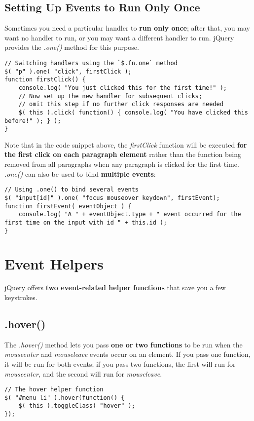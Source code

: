 \documentclass[10pt,letterpaper]{report}
\begin{document}
\subsection{Setting Up Events to Run Only Once}
Sometimes you need a particular handler to \textbf{run only once}; after that, you may want no handler to run, or you may want a different handler to run. jQuery provides the \textit{.one()} method for this purpose.
\begin{lstlisting}
// Switching handlers using the `$.fn.one` method
$( "p" ).one( "click", firstClick );
function firstClick() {
	console.log( "You just clicked this for the first time!" );
	// Now set up the new handler for subsequent clicks;
	// omit this step if no further click responses are needed
	$( this ).click( function() { console.log( "You have clicked this before!" ); } );
}
\end{lstlisting}
Note that in the code snippet above, the \textit{firstClick} function will be executed \textbf{for the first click on each paragraph element} rather than the function being removed from all paragraphs when any paragraph is clicked for the first time.\\
\textit{.one()} can also be used to bind \textbf{multiple events}:
\begin{lstlisting}
// Using .one() to bind several events
$( "input[id]" ).one( "focus mouseover keydown", firstEvent);
function firstEvent( eventObject ) {
	console.log( "A " + eventObject.type + " event occurred for the first time on the input with id " + this.id );
}
\end{lstlisting}
\section{Event Helpers}
jQuery offers \textbf{two event-related helper functions} that save you a few keystrokes.
\subsection{.hover()}
The \textit{.hover()} method lets you pass \textbf{one or two functions} to be run when the \textit{mouseenter} and \textit{mouseleave} events occur on an element. If you pass one function, it will be run for both events; if you pass two functions, the first will run for \textit{mouseenter}, and the second will run for \textit{mouseleave}.
\begin{lstlisting}
// The hover helper function
$( "#menu li" ).hover(function() {
	$( this ).toggleClass( "hover" );
});
\end{lstlisting}
\end{document}
